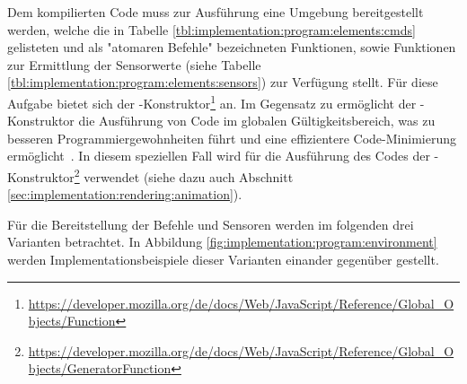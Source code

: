 Dem kompilierten Code muss zur Ausführung eine Umgebung bereitgestellt werden, welche die in Tabelle \ref{tbl:implementation:program:elements:cmds} gelisteten und als "atomaren Befehle" bezeichneten Funktionen, sowie Funktionen zur Ermittlung der Sensorwerte (siehe Tabelle \ref{tbl:implementation:program:elements:sensors}) zur Verfügung stellt. Für diese Aufgabe bietet sich der -Konstruktor\footnote{\url{https://developer.mozilla.org/de/docs/Web/JavaScript/Reference/Global_Objects/Function}} an. Im Gegensatz zu  ermöglicht der -Konstruktor die Ausführung von Code im globalen Gültigkeitsbereich, was zu besseren Programmiergewohnheiten führt und eine effizientere Code-Minimierung ermöglicht~\cite{mdn-function}. In diesem speziellen Fall wird für die Ausführung des Codes der -Konstruktor\footnote{\url{https://developer.mozilla.org/de/docs/Web/JavaScript/Reference/Global_Objects/GeneratorFunction}} verwendet (siehe dazu auch Abschnitt \ref{sec:implementation:rendering:animation}).

Für die Bereitstellung der Befehle und Sensoren werden im folgenden drei Varianten betrachtet. In Abbildung \ref{fig:implementation:program:environment} werden Implementationsbeispiele dieser Varianten einander gegenüber gestellt.

